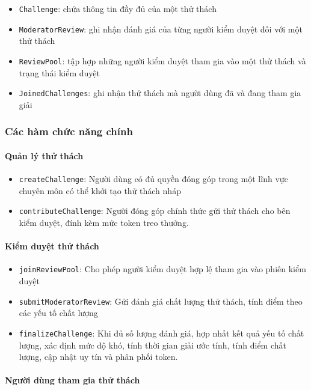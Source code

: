 \begin{itemize}
  \item \texttt{Challenge}: chứa thông tin đầy đủ của một thử thách
  \item \texttt{ModeratorReview}: ghi nhận đánh giá của từng người kiểm duyệt đối với một thử thách
  \item \texttt{ReviewPool}: tập hợp những người kiểm duyệt tham gia vào một thử thách và trạng thái kiểm duyệt
  \item \texttt{JoinedChallenges}: ghi nhận thử thách mà người dùng đã và đang tham gia giải
\end{itemize}

\subsubsection{Các hàm chức năng chính}

\paragraph{Quản lý thử thách}

\begin{itemize}
  \item \texttt{createChallenge}: Người dùng có đủ quyền đóng góp trong một lĩnh vực chuyên môn có thể khởi tạo thử thách nháp
  \item \texttt{contributeChallenge}: Người đóng góp chính thức gửi thử thách cho bên kiểm duyệt, đính kèm mức token treo thưởng.
\end{itemize}

\paragraph{Kiểm duyệt thử thách}

\begin{itemize}
  \item \texttt{joinReviewPool}: Cho phép người kiểm duyệt hợp lệ tham gia vào phiên kiểm duyệt
  \item \texttt{submitModeratorReview}: Gửi đánh giá chất lượng thử thách, tính điểm theo các yếu tố chất lượng
  \item \texttt{finalizeChallenge}: Khi đủ số lượng đánh giá, hợp nhất kết quả yếu tố chất lượng, xác định mức độ khó, tính thời gian giải ước tính, tính điểm chất lượng, cập nhật uy tín và phân phối token.
\end{itemize}

\paragraph{Người dùng tham gia thử thách}

